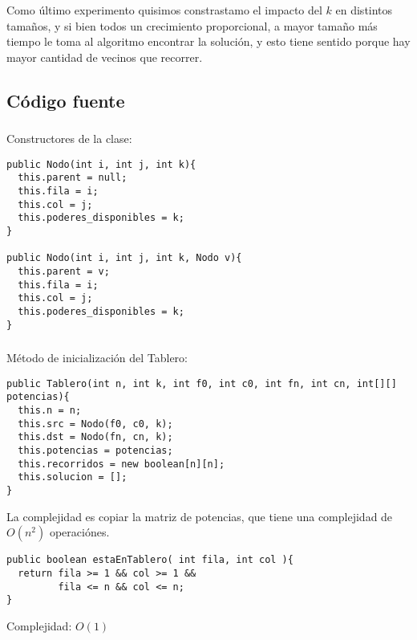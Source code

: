 Como \'ultimo experimento quisimos constrastamo el impacto del $k$ en distintos tama\~nos, y si bien todos un crecimiento proporcional, a mayor tama\~no m\'as tiempo le toma al algoritmo encontrar la soluci\'on, y esto tiene sentido porque hay mayor cantidad de vecinos que recorrer. 

\subsection{C\'odigo fuente}

\subsubsection{}

Constructores de la clase: 

\footnotesize\footnotesize\begin{verbatim}
public Nodo(int i, int j, int k){
  this.parent = null;
  this.fila = i; 
  this.col = j; 
  this.poderes_disponibles = k;
}

public Nodo(int i, int j, int k, Nodo v){
  this.parent = v;
  this.fila = i; 
  this.col = j; 
  this.poderes_disponibles = k;
}
\end{verbatim}\normalsize\normalsize

\subsubsection{}

M\'etodo de inicializaci\'on del Tablero: 

\footnotesize\begin{verbatim}
public Tablero(int n, int k, int f0, int c0, int fn, int cn, int[][] potencias){
  this.n = n;
  this.src = Nodo(f0, c0, k);
  this.dst = Nodo(fn, cn, k);
  this.potencias = potencias;
  this.recorridos = new boolean[n][n];
  this.solucion = [];
}
\end{verbatim}\normalsize

La complejidad es copiar la matriz de potencias, que tiene una complejidad de $O(n^2)$ operaci\'ones. 

\footnotesize\begin{verbatim}
public boolean estaEnTablero( int fila, int col ){
  return fila >= 1 && col >= 1 &&
         fila <= n && col <= n;
}
\end{verbatim}\normalsize

Complejidad: $O(1)$


